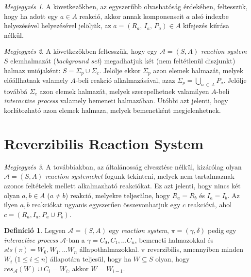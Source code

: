 \documentclass[12pt]{article}
\theoremstyle{definition}
\newtheorem*{definition*}{Definíció}
\theoremstyle{remark}
\newtheorem*{remark*}{Megjegyzés}
\theoremstyle{plain}
\theoremstyle{plain}
\newcommand{\reaction}[3]{
    (#1, \, #2, \, #3)
}
\begin{document}
    \begin{remark*}
        A következőkben, az egyszerűbb olvashatóság érdekében, feltesszük, hogy ha adott egy $a \in A$ reakció, akkor annak komponenseit $a$ alsó indexbe helyezésével helyezésével jelöljük, az $a = \reaction{R_{a}}{I_{a}}{P_{a}} \in A$ kifejezés kiírása nélkül.
    \end{remark*}

    \begin{remark*}
        A következőkben feltesszük, hogy egy $\mathscr{A} = (S, A)$ \textit{reaction system} $S$ elemhalmazát (\textit{background set}) megadhatjuk két (nem feltétlenül diszjunkt) halmaz uniójaként: $S = \Sigma_{p} \cup \Sigma_{c}$. Jelölje ekkor $\Sigma_{p}$ azon elemek halmazát, melyek előállhatnak valamely $A$-beli reakció alkalmazásával, azaz $\Sigma_{p} = \bigcup_{a \, \in \, A}P_{a}$. Jelölje továbbá $\Sigma_{c}$ azon elemek halmazát, melyek szerepelhetnek valamilyen $A$-beli \textit{interactive process} valamely bemeneti halmazában. Utóbbi azt jelenti, hogy korlátozható azon elemek halmaza, melyek bemenetként megjelenhetnek.
    \end{remark*}

    \section*{Reverzibilis Reaction System}

    \begin{remark*}
        A továbbiakban, az általánosság elvesztése nélkül, kizárólag olyan $\mathscr{A} = (S, A)$ \textit{reaction systemeket} fogunk tekinteni, melyek nem tartalmaznak azonos feltételek mellett alkalmazható reakciókat. Ez azt jelenti, hogy nincs két olyan $a, b\in A$ ($a \neq b$) reakció, melyekre teljesülne, hogy $R_{a} = R_{b}$ és $I_{a} = I_{b}$. Az ilyen $a, b$ reakciókat ugyanis egyszerűen összevonhatjuk egy $c$ reakcióvá, ahol $c = (R_{a}, I_{a}, P_{a} \cup P_{b})$.
    \end{remark*}

    \begin{definition*}
        Legyen $\mathscr{A} = (S, A)$ egy \textit{reaction system}, $\pi=(\gamma, \delta)$ pedig egy \textit{interactive process} $\mathscr{A}$-ban a $\gamma = C_{0}, C_{1}, \ldots C_{n}$, bemeneti halmazokkal és $\textit{sts}(\pi)=W_{0},W_{1},\ldots W_{n}$ állapothalmazokkal. $\pi$ reverzibilis, amennyiben minden $W_{i}$ ($1 \leq i \leq n$) állapotára teljesül, hogy ha $W \subseteq S$ olyan, hogy $res_{\mathscr{A}}(W) \cup C_{i} = W_{i}$, akkor $W = W_{i - 1}$.
    \end{definition*}
\end{document}

